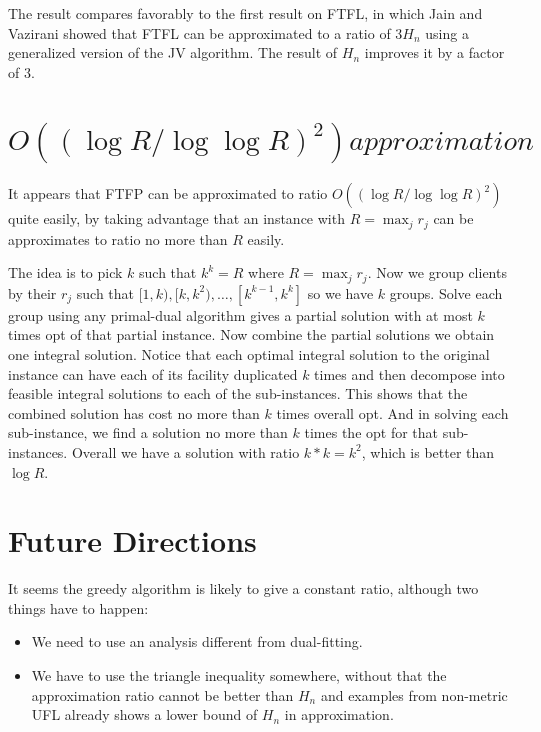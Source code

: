 \documentclass{article}
\begin{document}
The result compares favorably to the first result on FTFL, in which
Jain and Vazirani showed that FTFL can be approximated to a ratio of
$3H_n$ using a generalized version of the JV algorithm. The result of
$H_n$ improves it by a factor of $3$.

\section{$O((\log R/\log\log R)^2) approximation$}
It appears that FTFP can be approximated to ratio $O((\log R / \log\log
R)^2)$ quite easily, by taking advantage that an instance with $R =
\max_j r_j$ can be approximates to ratio no more than $R$ easily.

The idea is to pick $k$ such that $k^k = R$ where $R = \max_j
r_j$. Now we group clients by their $r_j$ such that $[1,k), [k,k^2),
\ldots, [k^{k-1}, k^k]$ so we have $k$ groups. Solve each group using
any primal-dual algorithm gives a partial solution with at most $k$
times opt of that partial instance. Now combine the partial solutions
we obtain one integral solution. Notice that each optimal integral
solution to the original instance can have each of its facility
duplicated $k$ times and then decompose into feasible integral
solutions to each of the sub-instances. This shows that the combined
solution has cost no more than $k$ times overall opt. And in solving
each sub-instance, we find a solution no more than $k$ times the opt
for that sub-instances. Overall we have a solution with ratio $k*k =
k^2$, which is better than $\log R$.

\section{Future Directions}
It seems the greedy algorithm is likely to give a constant ratio,
although two things have to happen:
\begin{itemize}
\item We need to use an analysis different from dual-fitting.
\item We have to use the triangle inequality somewhere, without that
  the approximation ratio cannot be better than $H_n$ and examples
  from non-metric UFL already shows a lower bound of $H_n$ in approximation.
\end{itemize}
\end{document}
